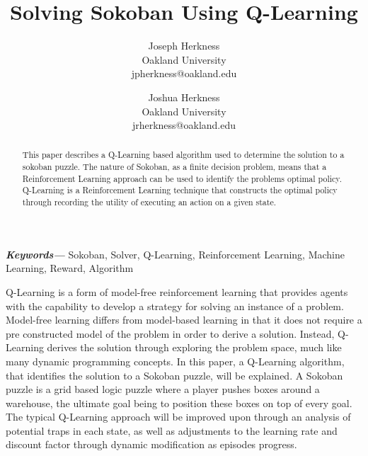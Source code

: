 \documentclass[times, 10pt,twocolumn]{article}
\begin{document}
\title{Solving Sokoban Using Q-Learning}

\author{Joseph Herkness\\
Oakland University\\
jpherkness@oakland.edu\\
\and
Joshua Herkness\\
Oakland University\\
jrherkness@oakland.edu\\
}

\maketitle
\thispagestyle{empty}

\begin{abstract}
   This paper describes a Q-Learning based algorithm used to determine the solution to a sokoban puzzle. The nature of Sokoban, as a finite decision problem, means that a Reinforcement Learning approach can be used to identify the problems optimal policy. Q-Learning is a Reinforcement Learning technique that constructs the optimal policy through recording the utility of executing an action on a given state. 
\end{abstract}

\providecommand{\keywords}[1]{\textbf{\textit{Keywords---}} #1}
\keywords{Sokoban, Solver, Q-Learning, Reinforcement Learning, Machine Learning, Reward, Algorithm}


Q-Learning is a form of model-free reinforcement learning that provides agents with the capability to develop a strategy for solving an instance of a problem. Model-free learning differs from model-based learning in that it does not require a pre constructed model of the problem in order to derive a solution. Instead, Q-Learning derives the solution through exploring the problem space, much like many dynamic programming concepts. In this paper, a Q-Learning algorithm, that identifies the solution to a Sokoban puzzle, will be explained. A Sokoban puzzle is a grid based logic puzzle where a player pushes boxes around a warehouse, the ultimate goal being to position these boxes on top of every goal. The typical Q-Learning approach will be improved upon through an analysis of potential traps in each state, as well as adjustments to the learning rate and discount factor through dynamic modification as episodes progress. 
\end{document}
